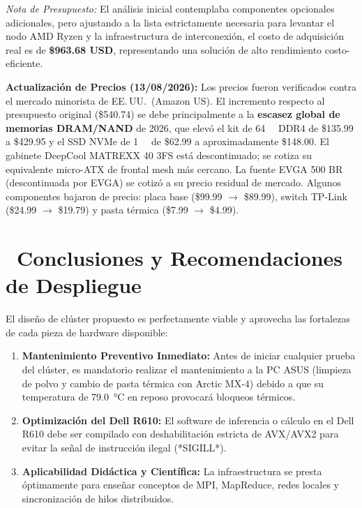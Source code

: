 \documentclass[11pt,a4paper]{article}
\newcommand{\iconotexto}[2]{\textcolor{cyanNeon}{\faIcon{#1}}~#2}
\begin{document}
\textit{Nota de Presupuesto:} El análisis inicial contemplaba componentes opcionales adicionales, pero ajustando a la lista estrictamente necesaria para levantar el nodo AMD Ryzen y la infraestructura de interconexión, el costo de adquisición real es de \textbf{\$963.68 USD}, representando una solución de alto rendimiento costo-eficiente.

\begin{tcolorbox}[cajaContenido]
\textbf{ Actualización de Precios (13/08/2026):} Los precios fueron verificados contra el mercado minorista de EE.\,UU.\ (Amazon US). El incremento respecto al presupuesto original (\$540.74) se debe principalmente a la \textbf{escasez global de memorias DRAM/NAND} de 2026, que elevó el kit de \SI{64}{\giga\byte} DDR4 de \$135.99 a \$429.95 y el SSD NVMe de \SI{1}{\tera\byte} de \$62.99 a aproximadamente \$148.00. El gabinete DeepCool MATREXX 40 3FS está descontinuado; se cotiza su equivalente micro-ATX de frontal mesh más cercano. La fuente EVGA 500 BR (descontinuada por EVGA) se cotizó a su precio residual de mercado. Algunos componentes bajaron de precio: placa base (\$99.99 $\rightarrow$ \$89.99), switch TP-Link (\$24.99 $\rightarrow$ \$19.79) y pasta térmica (\$7.99 $\rightarrow$ \$4.99).
\end{tcolorbox}

\section[Conclusiones y Recomendaciones de Despliegue]{\iconotexto{flag-checkered}{Conclusiones y Recomendaciones de Despliegue}}

El diseño de clúster propuesto es perfectamente viable y aprovecha las fortalezas de cada pieza de hardware disponible:
\begin{enumerate}
    \item \textbf{Mantenimiento Preventivo Inmediato:} Antes de iniciar cualquier prueba del clúster, es mandatorio realizar el mantenimiento a la PC ASUS (limpieza de polvo y cambio de pasta térmica con Arctic MX-4) debido a que su temperatura de \SI{79.0}{\celsius} en reposo provocará bloqueos térmicos.
    \item \textbf{Optimización del Dell R610:} El software de inferencia o cálculo en el Dell R610 debe ser compilado con deshabilitación estricta de AVX/AVX2 para evitar la señal de instrucción ilegal (*SIGILL*).
    \item \textbf{Aplicabilidad Didáctica y Científica:} La infraestructura se presta óptimamente para enseñar conceptos de MPI, MapReduce, redes locales y sincronización de hilos distribuidos.
\end{enumerate}
\end{document}
